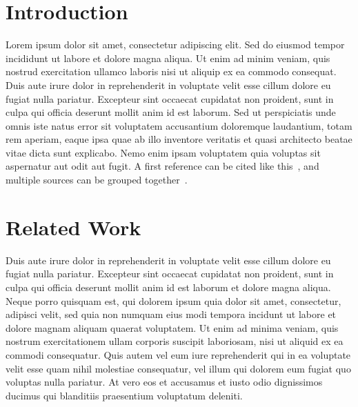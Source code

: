 
\section{Introduction}

Lorem ipsum dolor sit amet, consectetur adipiscing elit. Sed do eiusmod
tempor incididunt ut labore et dolore magna aliqua. Ut enim ad minim
veniam, quis nostrud exercitation ullamco laboris nisi ut aliquip ex ea
commodo consequat. Duis aute irure dolor in reprehenderit in voluptate
velit esse cillum dolore eu fugiat nulla pariatur. Excepteur sint
occaecat cupidatat non proident, sunt in culpa qui officia deserunt
mollit anim id est laborum. Sed ut perspiciatis unde omnis iste natus
error sit voluptatem accusantium doloremque laudantium, totam rem
aperiam, eaque ipsa quae ab illo inventore veritatis et quasi
architecto beatae vitae dicta sunt explicabo. Nemo enim ipsam
voluptatem quia voluptas sit aspernatur aut odit aut fugit. A first
reference can be cited like this~\cite{ref_article}, and multiple
sources can be grouped together~\cite{ref_book, ref_inproceedings}.

\section{Related Work}

Duis aute irure dolor in reprehenderit in voluptate velit esse cillum
dolore eu fugiat nulla pariatur. Excepteur sint occaecat cupidatat non
proident, sunt in culpa qui officia deserunt mollit anim id est laborum
et dolore magna aliqua. Neque porro quisquam est, qui dolorem ipsum quia
dolor sit amet, consectetur, adipisci velit, sed quia non numquam eius
modi tempora incidunt ut labore et dolore magnam aliquam quaerat
voluptatem. Ut enim ad minima veniam, quis nostrum exercitationem ullam
corporis suscipit laboriosam, nisi ut aliquid ex ea commodi consequatur.
Quis autem vel eum iure reprehenderit qui in ea voluptate velit esse
quam nihil molestiae consequatur, vel illum qui dolorem eum fugiat quo
voluptas nulla pariatur. At vero eos et accusamus et iusto odio
dignissimos ducimus qui blanditiis praesentium voluptatum deleniti.


